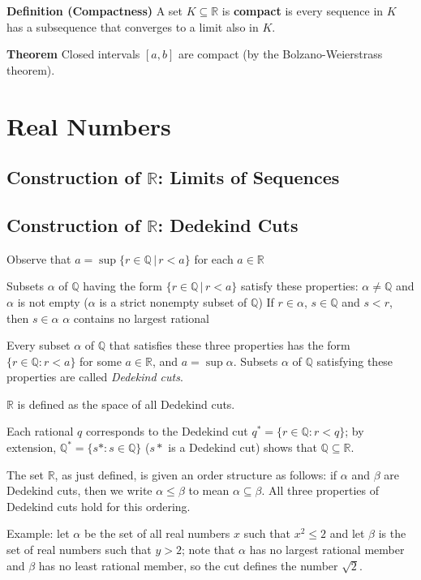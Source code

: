 \documentclass[12pt]{article}
\newcommand{\Q}{\mathbb{Q}}
\newcommand{\R}{\mathbb{R}}
\begin{document}
\textbf{Definition (Compactness)} A set $K \subseteq \R$ is \textbf{compact} is every sequence in $K$ has a subsequence that converges to a limit also in $K$.

\textbf{Theorem} Closed intervals $[a,b]$ are compact (by the Bolzano-Weierstrass theorem).



\section{Real Numbers}

\subsection{Construction of $\R$: Limits of Sequences}

\subsection{Construction of $\R$: Dedekind Cuts}

Observe that $a = \sup \{r \in \Q \, | \, r < a \}$ for each $a \in \R$

Subsets $\alpha$ of $\Q$ having the form $\{r \in \Q \, | \, r < a \}$ satisfy these properties:
$\alpha \neq \Q$ and $\alpha$ is not empty ($\alpha$ is a strict nonempty subset of $\Q$)
If $r \in \alpha$, $s \in \Q$ and $s < r$, then $s \in \alpha$
$\alpha$ contains no largest rational

Every subset $\alpha$ of $\Q$ that satisfies these three properties has the form $\{r \in \Q : r < a\}$ for some $a \in \R$, and $a = \sup\alpha$. Subsets $\alpha$ of $\Q$ satisfying these properties are called \textit{Dedekind cuts}.

$\R$ is defined as the space of all Dedekind cuts.

Each rational $q$ corresponds to the Dedekind cut $q^{*}=\{r \in \Q : r < q\}$; by extension, $\Q^{*} = \{s* : s \in \mathbb{Q} \}$ ($s*$ is a Dedekind cut) shows that $\Q \subseteq \R$.

The set $\R$, as just defined, is given an order structure as follows: if $\alpha$ and $\beta$ are Dedekind cuts, then we write $\alpha \leq \beta$ to mean $\alpha \subseteq \beta$. All three properties of Dedekind cuts hold for this ordering.

Example: let $\alpha$ be the set of all real numbers $x$ such that $x^{2} \leq 2$ and let $\beta$ is the set of real numbers such that $y > 2$; note that $\alpha$ has no largest rational member and $\beta$ has no least rational member, so the cut defines the number $\sqrt{2}$. %
\end{document}
